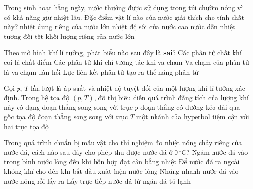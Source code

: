	\begin{ex}%
		Trong sinh hoạt hằng ngày, nước thường được sử dụng trong túi chườm nóng vì có khả năng giữ nhiệt lâu. Đặc điểm vật lí nào của nước giải thích cho tính chất này?
		\choice
		{\True nhiệt dung riêng của nước lớn}
		{nhiệt độ sôi của nước cao}
		{nước dẫn nhiệt tương đối tốt}
		{khối lượng riêng của nước lớn}
	\end{ex}

	\begin{ex}%
		Theo mô hình khí lí tưởng, phát biểu nào sau đây là \textbf{sai}?
		\choice
		{Các phân tử chất khí coi là chất điểm}
		{Các phân tử khí chỉ tương tác khi va chạm}
		{Va chạm của phân tử là va chạm đàn hồi}
		{\True Lực liên kết phân tử tạo ra thế năng phân tử}
	\end{ex}

	\begin{ex}%
		Gọi $p$, $T$ lần lượt là áp suất và nhiệt độ tuyệt đối của một lượng khí lí tưởng xác định. Trong hệ tọa độ $(p,T)$, đồ thị biểu diễn quá trình đẳng tích của lượng khí này có dạng
		\choice
		{đoạn thẳng song song với trục $p$}
		{\True đoạn thẳng có đường kéo dài qua gốc tọa độ}
		{đoạn thẳng song song với trục $T$}
		{một nhánh của hyperbol tiệm cận với hai trục tọa độ}
	\end{ex}

	\begin{ex}%
		Trong quá trình chuẩn bị mẫu vật cho thí nghiệm đo nhiệt nóng chảy riêng của nước đá, cách nào sau đây cho phép thu được nước đá ở $0\,^\circ\text{C}$?
		\choice
		{\True Ngâm nước đá vào trong bình nước lỏng đến khi hỗn hợp đạt cân bằng nhiệt}
		{Để nước đá ra ngoài không khí cho đến khi bắt đầu xuất hiện nước lỏng}
		{Nhúng nhanh nước đá vào nước nóng rồi lấy ra}
		{Lấy trực tiếp nước đá từ ngăn đá tủ lạnh}
	\end{ex}

